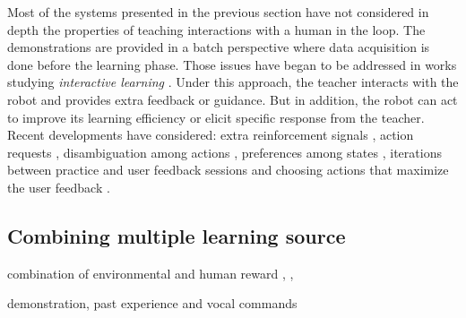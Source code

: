 Most of the systems presented in the previous section have not considered in depth the properties of teaching interactions with a human in the loop. The demonstrations are provided in a batch perspective where data acquisition is done before the learning phase. Those issues have began to be addressed in works studying \textit{interactive learning} \cite{kaplan2002robotic,nicolescu2003natural,Breazeal2004,thomaz2008teachable}. Under this approach, the teacher interacts with the robot and provides extra feedback or guidance. But in addition, the robot can act to improve its learning efficiency or elicit specific response from the teacher. Recent developments have considered: extra reinforcement signals \cite{thomaz2008teachable}, action requests \cite{macl09airl}, disambiguation among actions \cite{chernova09jair}, preferences among states \cite{Mason2011}, iterations between practice and user feedback sessions \cite{judah2010reinforcement} and choosing actions that maximize the user feedback \cite{knox2009interactively}.


\subsection{Combining multiple learning source}


combination of environmental and human reward \cite{knox2010combining}, \cite{griffith2013policy}, \cite{grave2013learning}


\cite{pardowitz2007incremental} demonstration, past experience and vocal commands

